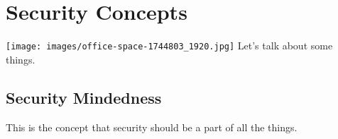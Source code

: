 \chapter{Security Concepts}

\texttt{[image: images/office-space-1744803\_1920.jpg]}
\justify{}
Let's talk about some things.

\section{Security Mindedness}
\justify{}
This is the concept that security should be a part of all the things. 
